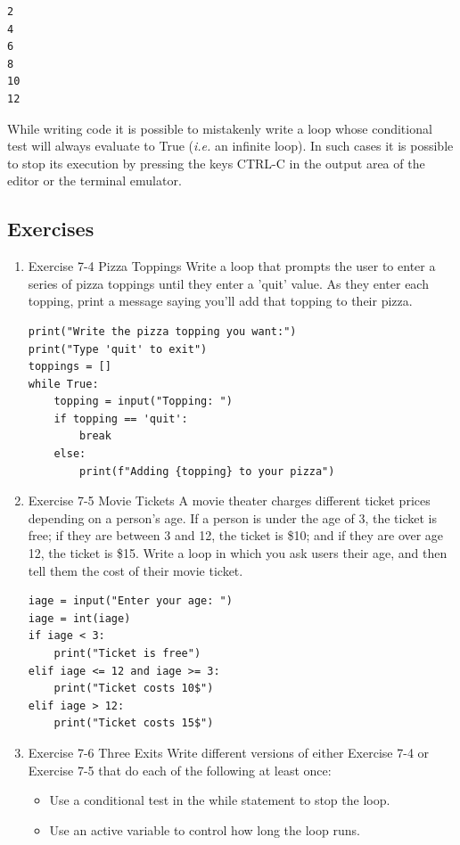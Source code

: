 \documentclass[10pt]{book}
\begin{document}
\label{org059b103}
\begin{verbatim}
2
4
6
8
10
12
\end{verbatim}

While writing code it is possible to mistakenly write a loop whose conditional test will always evaluate to True (\emph{i.e.} an infinite loop). In such cases it is possible to stop its execution by pressing the keys CTRL-C in the output area of the editor or the terminal emulator.
\subsection{Exercises}
\label{sec:org942ae5d}
\begin{enumerate}
\item Exercise 7-4 Pizza Toppings
\label{sec:orgc9c81c4}
Write a loop that prompts the user to enter a series of pizza toppings until they enter a 'quit' value. As they enter each topping, print a message saying you’ll add that topping to their pizza.
\begin{verbatim}
print("Write the pizza topping you want:")
print("Type 'quit' to exit")
toppings = []
while True:
    topping = input("Topping: ")
    if topping == 'quit':
        break
    else:
        print(f"Adding {topping} to your pizza")
\end{verbatim}
\item Exercise 7-5 Movie Tickets
\label{sec:org7064fe4}
A movie theater charges different ticket prices depending on a person’s age. If a person is under the age of 3, the ticket is free; if they are between 3 and 12, the ticket is \$10; and if they are over age 12, the ticket is \$15. Write a loop in which you ask users their age, and then tell them the cost of their movie ticket.
\begin{verbatim}
iage = input("Enter your age: ")
iage = int(iage)
if iage < 3:
    print("Ticket is free")
elif iage <= 12 and iage >= 3:
    print("Ticket costs 10$")
elif iage > 12:
    print("Ticket costs 15$")
\end{verbatim}
\item Exercise 7-6 Three Exits
\label{sec:orgac78e89}
Write different versions of either Exercise 7-4 or Exercise 7-5 that do each of the following at least once:
\begin{itemize}
\item Use a conditional test in the while statement to stop the loop.
\item Use an active variable to control how long the loop runs.

\end{itemize}
\end{enumerate}
\end{document}
